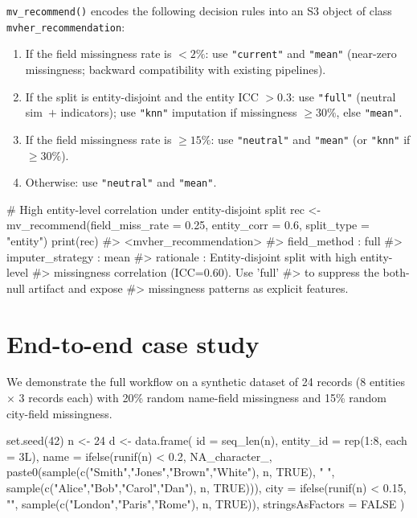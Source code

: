 \documentclass[a4paper]{article}
\begin{document}
\begin{article}
\texttt{mv\_recommend()} encodes the following decision rules into an
S3 object of class \texttt{mvher\_recommendation}:

\begin{enumerate}
  \item If the field missingness rate is $< 2\%$: use \texttt{"current"}
    and \texttt{"mean"} (near-zero missingness; backward compatibility
    with existing pipelines).
  \item If the split is entity-disjoint and the entity ICC $> 0.3$:
    use \texttt{"full"} (neutral sim~$+ $ indicators); use
    \texttt{"knn"} imputation if missingness $\geq 30\%$, else
    \texttt{"mean"}.
  \item If the field missingness rate is $\geq 15\%$: use
    \texttt{"neutral"} and \texttt{"mean"} (or \texttt{"knn"} if $\geq
    30\%$).
  \item Otherwise: use \texttt{"neutral"} and \texttt{"mean"}.
\end{enumerate}

\begin{example}
# High entity-level correlation under entity-disjoint split
rec <- mv_recommend(field_miss_rate = 0.25, entity_corr = 0.6,
                    split_type = "entity")
print(rec)
#> <mvher_recommendation>
#>   field_method     : full
#>   imputer_strategy : mean
#>   rationale        : Entity-disjoint split with high entity-level
#>                      missingness correlation (ICC=0.60). Use 'full'
#>                      to suppress the both-null artifact and expose
#>                      missingness patterns as explicit features.
\end{example}

\section{End-to-end case study}
\label{sec:casestudy}

We demonstrate the full  workflow on a synthetic dataset of
24 records (8 entities $\times$ 3 records each) with 20\% random
name-field missingness and 15\% random city-field missingness.

\begin{example}
set.seed(42)
n <- 24
d <- data.frame(
  id        = seq_len(n),
  entity_id = rep(1:8, each = 3L),
  name      = ifelse(runif(n) < 0.2, NA_character_,
               paste0(sample(c("Smith","Jones","Brown","White"),
                             n, TRUE), " ",
                      sample(c("Alice","Bob","Carol","Dan"),
                             n, TRUE))),
  city      = ifelse(runif(n) < 0.15, "",
               sample(c("London","Paris","Rome"), n, TRUE)),
  stringsAsFactors = FALSE
)
\end{example}


\end{article}
\end{document}
